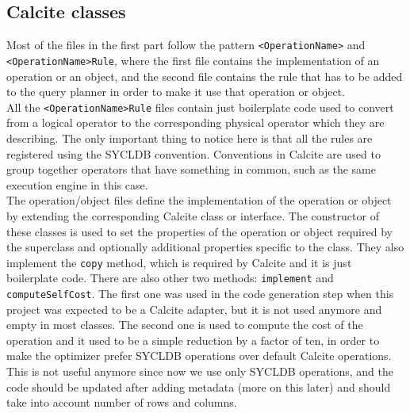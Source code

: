 \documentclass[a4paper, 10pt]{article}
\begin{document}
\subsection{Calcite classes}

Most of the files in the first part follow the pattern \texttt{<OperationName>} and \texttt{<OperationName>Rule}, where the first file contains the implementation of an operation or an object, and the second file contains the rule that has to be added to the query planner in order to make it use that operation or object.
\\
All the \texttt{<OperationName>Rule} files contain just boilerplate code used to convert from a logical operator to the corresponding physical operator which they are describing. The only important thing to notice here is that all the rules are registered using the SYCLDB convention. Conventions in Calcite are used to group together operators that have something in common, such as the same execution engine in this case.
\\
The operation/object files define the implementation of the operation or object by extending the corresponding Calcite class or interface. The constructor of these classes is used to set the properties of the operation or object required by the superclass and optionally additional properties specific to the class. They also implement the \texttt{copy} method, which is required by Calcite and it is just boilerplate code. There are also other two methods: \texttt{implement} and \texttt{computeSelfCost}. The first one was used in the code generation step when this project was expected to be a Calcite adapter, but it is not used anymore and empty in most classes. The second one is used to compute the cost of the operation and it used to be a simple reduction by a factor of ten, in order to make the optimizer prefer SYCLDB operations over default Calcite operations. This is not useful anymore since now we use only SYCLDB operations, and the code should be updated after adding metadata (more on this later) and should take into account number of rows and columns.
\end{document}
